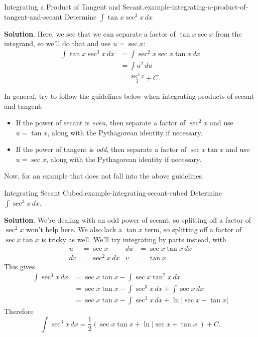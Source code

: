 \documentclass[10pt,]{book}
\numberwithin{equation}{section}
\begin{document}
\begin{example}{Integrating a Product of Tangent and Secant.}{example-integrating-a-product-of-tangent-and-secant}%
\hypertarget{p-535}{}%
Determine \(\int\tan x\sec^{3} x\,dx\)%
\par\smallskip%
\noindent\textbf{Solution}.\hypertarget{solution-118}{}\quad%
\hypertarget{p-536}{}%
Here, we see that we can separate a factor of \(\tan x\sec x\) from the integrand, so we'll do that and use \(u = \sec x\):%
%
\begin{align*}
\int\tan x\sec^{3}x\,dx & = \int \sec^{2}x \sec x\tan x\,dx \\
& = \int u^{2}\,du \\
& = \frac{\sec^{3}x}{3} + C. 
\end{align*}
\end{example}
\hypertarget{p-537}{}%
In general, try to follow the guidelines below when integrating products of secant and tangent: \leavevmode%
\begin{itemize}[label=\textbullet]
\item{}If the power of secant is \emph{even}, then separate a factor of \(\sec^{2}x\) and use \(u = \tan x\), along with the Pythagorean identity if necessary.%
\item{}If the power of tangent is \emph{odd}, then separate a factor of \(\sec x\tan x\) and use \(u = \sec x\), along with the Pythagorean identity if necessary.%
\end{itemize}
%
\par
\hypertarget{p-538}{}%
Now, for an example that does not fall into the above guidelines.%
\begin{example}{Integrating Secant Cubed.}{example-integrating-secant-cubed}%
\hypertarget{p-539}{}%
Determine \(\int\sec^{3}x\,dx\).%
\par\smallskip%
\noindent\textbf{Solution}.\hypertarget{solution-119}{}\quad%
\hypertarget{p-540}{}%
We're dealing with an odd power of secant, so splitting off a factor of \(\sec^{2}x\) won't help here. We also lack a \(\tan x\) term, so splitting off a factor of \(\sec x\tan x\) is tricky as well. We'll try integrating by parts instead, with%
\begin{align*}
u & = \sec x & du & = \sec x\tan x\,dx\\
dv & = \sec^{2}x\,dx & v & = \tan x 
\end{align*}
This gives%
%
\begin{align*}
\int\sec^{3}x\,dx & = \sec x\tan x - \int \sec x\tan^{2}x\,dx \\
& = \sec x\tan x - \int\sec^{3}x\,dx + \int\sec x\,dx \\
& = \sec x\tan x - \int\sec^{3}x\,dx + \ln|\sec x + \tan x| 
\end{align*}
\hypertarget{p-541}{}%
Therefore%
\begin{equation*}
\int\sec^{3}x\,dx = \frac{1}{2}(\sec x\tan x + \ln|\sec x + \tan x|) + C.
\end{equation*}
%
\end{example}
%
%
\typeout{************************************************}
\typeout{************************************************}
%
\end{document}
